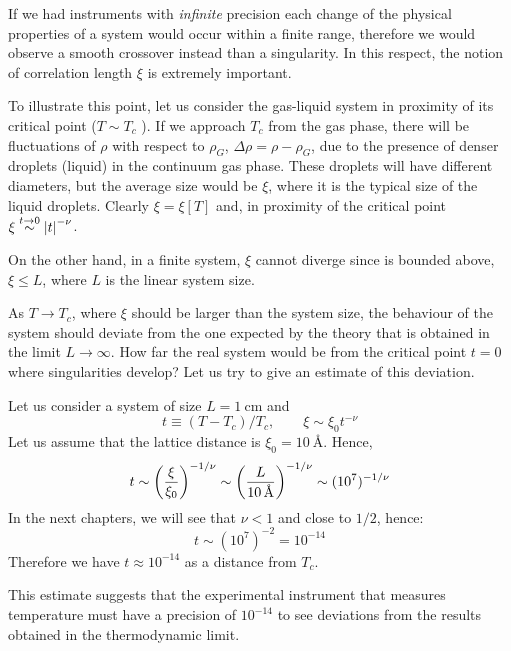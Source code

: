 \documentclass[../../Main/Main.tex]{subfiles}
\begin{document}
If we had instruments with \emph{infinite} precision each change of the physical properties of a system would occur within a finite range, therefore we would observe a smooth crossover instead than a singularity. In this respect, the notion of correlation length \( \xi  \) is extremely important.

To illustrate this point, let us consider the gas-liquid system in proximity of its critical point (\( T \sim T_c \) ). If we approach \( T_c \) from the gas phase, there will be fluctuations of \( \rho  \) with respect to \( \rho _G \), \( \Delta \rho = \rho - \rho _G \), due to the presence of denser droplets (liquid) in the continuum gas phase.
These droplets will have different diameters, but the average size would be \( \xi  \), where it is the typical size of the liquid droplets.
Clearly \( \xi = \xi [T] \) and, in proximity of the critical point \( \xi  \overset{t \rightarrow 0}{\sim } \abs{t}^{-\nu }   \).

On the other hand, in a finite system, \( \xi  \) cannot diverge since is bounded above, \( \xi \le L \), where \( L \) is the linear system size.

As \( T \rightarrow T_c \), where \( \xi  \) should be larger than the system size, the behaviour of the system should deviate from the one expected by the theory that is obtained in the limit \( L \rightarrow \infty  \). How far the real system would be from the critical point \( t=0 \) where singularities develop? Let us try to give an estimate of this deviation.

 Let us consider a system of size \( L = \SI{1}{\cm}  \) and
\begin{equation*}
  t \equiv (T-T_c)/T_c, \qquad \xi \sim \xi _0 t^{-\nu }
\end{equation*}
Let us assume that the lattice distance is \( \xi _0 = \SI{10}{\angstrom}  \). Hence,
 \begin{equation}
   t \sim \qty(\frac{\xi }{\xi _0})^{-1/\nu } \sim \qty(\frac{L}{\SI{10}{\angstrom} })^{-1/\nu } \sim (10^{7})^{-1/\nu }
 \end{equation}
In the next chapters, we will see that \( \nu < 1 \) and close to \( 1/2 \), hence:
\begin{equation*}
  t \sim (10^{7})^{-2 } = 10^{-14}
\end{equation*}
Therefore we have \( t \approx 10^{-14} \)  as a distance from \( T_c \).

This estimate suggests that the experimental instrument that measures temperature must have a precision of \( 10^{-14} \)  to see deviations from the results obtained in the thermodynamic limit.
\end{document}
